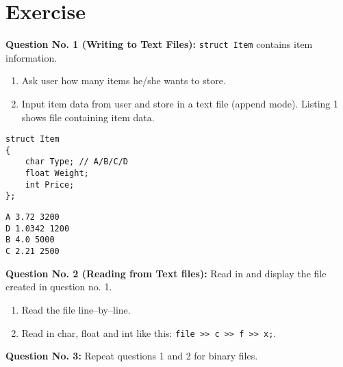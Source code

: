 \documentclass[12pt,a4paper]{article}
\begin{document}
\section{Exercise}
\textbf{Question No. 1 (Writing to Text Files):} \texttt{struct Item} contains item information.\\
\vspace{-0.5cm}\begin{enumerate}
\item Ask user how many items he/she wants to store.
\item Input item data from user and store in a text file (append mode). Listing 1 shows file containing item data.
\end{enumerate}
\begin{lstlisting}
struct Item
{
	char Type; // A/B/C/D
	float Weight;
	int Price;
};
\end{lstlisting}
\begin{lstlisting}[caption={Sample text file. Entries are: Type Weight Price}]
A 3.72 3200
D 1.0342 1200
B 4.0 5000
C 2.21 2500
\end{lstlisting}
\textbf{Question No. 2 (Reading from Text files):} Read in and display the file created in question no. 1.\\
\vspace{-0.5cm}\begin{enumerate}
\item Read the file line--by--line.
\item Read in char, float and int like this: \verb|file >> c >> f >> x;|.
\end{enumerate}
\textbf{Question No. 3:} Repeat questions 1 and 2 for binary files.
\end{document}
